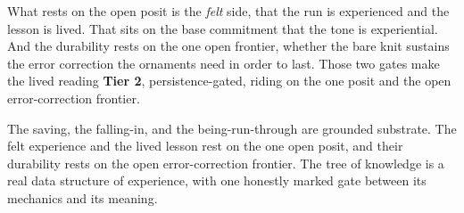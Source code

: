 What rests on the open posit is the \emph{felt} side, that the run is experienced and the lesson is lived. That sits on the base commitment that the tone is experiential. And the durability rests on the one open frontier, whether the bare knit sustains the error correction the ornaments need in order to last. Those two gates make the lived reading \textbf{Tier 2}, persistence-gated, riding on the one posit and the open error-correction frontier.

\begin{result}
The saving, the falling-in, and the being-run-through are grounded substrate. The felt experience and the lived lesson rest on the one open posit, and their durability rests on the open error-correction frontier. The tree of knowledge is a real data structure of experience, with one honestly marked gate between its mechanics and its meaning.
\end{result}
